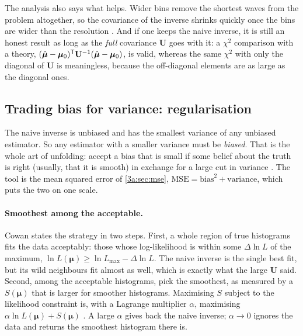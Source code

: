 The analysis also says what helps. Wider bins remove the shortest waves from the problem
altogether, so the covariance of the inverse shrinks quickly once the bins are wider than the
resolution . And if one keeps the naive inverse, it is still an honest
result as long as the \emph{full} covariance $\mathbf U$ goes with it: a $\chi^2$ comparison with
a theory, $(\hat{\bm\mu}-\bm\mu_0)^{\mathsf{T}}\mathbf U^{-1}(\hat{\bm\mu}-\bm\mu_0)$, is valid, whereas the same
$\chi^2$ with only the diagonal of $\mathbf U$ is meaningless, because the off-diagonal elements are
as large as the diagonal ones.

\subsection{Trading bias for variance: regularisation}
\label{6b:sec:unf-tikhonov}

The naive inverse is unbiased and has the smallest variance of any unbiased estimator. So any
estimator with a smaller variance must be \emph{biased}. That is the whole art of unfolding:
accept a bias that is small if some belief about the truth is right (usually, that it is
smooth) in exchange for a large cut in variance . The tool is the
mean squared error of \cref{3a:sec:mse}, $\text{MSE}=\text{bias}^2+\text{variance}$, which
puts the two on one scale.

\paragraph{Smoothest among the acceptable.} Cowan states the strategy in two steps. First, a
whole region of true histograms fits the data acceptably: those whose log-likelihood is within
some $\Delta\ln L$ of the maximum, $\ln L(\bm\mu)\ge\ln L_{\max}-\Delta\ln L$. The naive inverse is the
single best fit, but its wild neighbours fit almost as well, which is exactly what the large
$\mathbf U$ said. Second, among the acceptable histograms, pick the smoothest, as measured by a
 $S(\bm\mu)$ that is larger for smoother histograms. Maximising
$S$ subject to the likelihood constraint is, with a Lagrange multiplier $\alpha$, maximising
$\alpha\ln L(\bm\mu)+S(\bm\mu)$ . A large $\alpha$ gives back the
naive inverse; $\alpha\to0$ ignores the data and returns the smoothest histogram there is.

